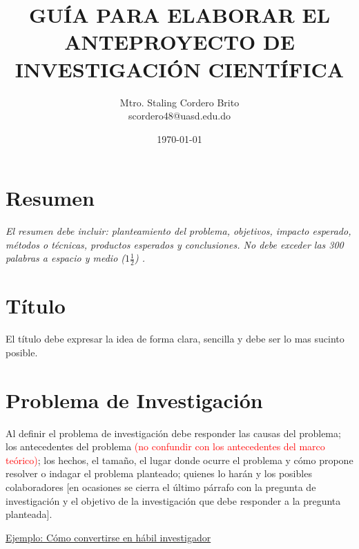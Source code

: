 \documentclass[12pt,a4paper]{article}
\title{\textbf{GUÍA PARA ELABORAR EL ANTEPROYECTO DE INVESTIGACIÓN CIENTÍFICA}}
\author{Mtro. Staling Cordero Brito \\ scordero48@uasd.edu.do}
\date{\today}
\begin{document}
\maketitle
\thispagestyle{empty}

\tableofcontents
\newpage

\section*{Resumen}

\noindent
\textit{El resumen debe incluir: planteamiento del problema, objetivos, impacto esperado, métodos o técnicas, productos esperados y conclusiones. No debe exceder las 300 palabras a espacio y medio (\(1\frac{1}{2}\))
.}

\section{Título}
 \noindent
El título debe expresar la idea de forma clara, sencilla y debe ser lo mas sucinto posible.

\section{Problema de Investigación}
\noindent
Al definir el problema de investigación debe responder las causas del problema; los
antecedentes del problema \textcolor{red}{(no confundir con los antecedentes del marco teórico)}; los hechos, el tamaño, el lugar donde ocurre el problema y cómo
propone resolver o indagar el problema planteado; quienes lo harán y los posibles
colaboradores [en ocasiones se cierra el último párrafo con la pregunta de
investigación y el objetivo de la investigación que debe responder a la pregunta
planteada].

\href{file:///C:/Users/stali/Mi%20unidad/RD%20Docencias/Maestr%C3%ADa%20Humanidades/SEMINARIO%20DE%20INVESTIGACI%C3%93N%20CIENT%C3%8DFICA/SeminarioI_visualcode/Archivosgenerales/comoconvertirseeninvestigador.pdf}{Ejemplo: Cómo convertirse en hábil investigador}
\end{document}
